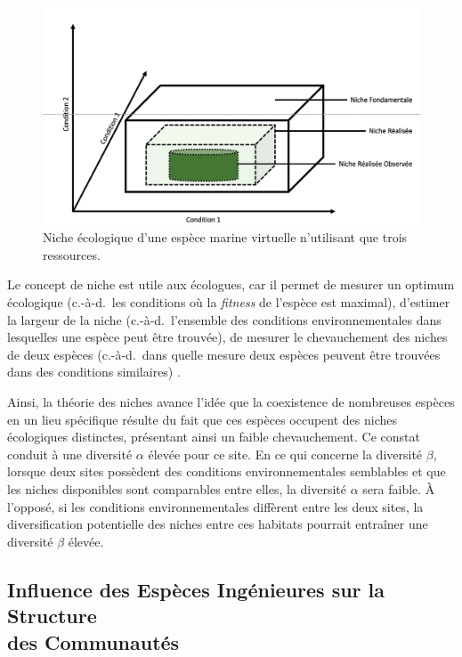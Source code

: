 \begin{refsection}
\begin{figure}
\hypertarget{fig:intro4}{%
\centering
\includegraphics{02-Introduction/figures/hypervolume_niche.png}
\caption{Niche écologique d'une espèce marine virtuelle n'utilisant que
trois ressources.}\label{fig:intro4}
}
\end{figure}

Le concept de niche est utile aux écologues, car il permet de mesurer un
optimum écologique (c.-à-d.~les conditions où la \emph{fitness} de
l'espèce est maximal), d'estimer la largeur de la niche
(c.-à-d.~l'ensemble des conditions environnementales dans lesquelles une
espèce peut être trouvée), de mesurer le chevauchement des niches de
deux espèces (c.-à-d.~dans quelle mesure deux espèces peuvent être
trouvées dans des conditions similaires) \autocite{Chase_2003}.

Ainsi, la théorie des niches avance l'idée que la coexistence de
nombreuses espèces en un lieu spécifique résulte du fait que ces espèces
occupent des niches écologiques distinctes, présentant ainsi un faible
chevauchement. Ce constat conduit à une diversité \(\alpha\) élevée pour
ce site. En ce qui concerne la diversité \(\beta\), lorsque deux sites
possèdent des conditions environnementales semblables et que les niches
disponibles sont comparables entre elles, la diversité \(\alpha\) sera
faible. À l'opposé, si les conditions environnementales diffèrent entre
les deux sites, la diversification potentielle des niches entre ces
habitats pourrait entraîner une diversité \(\beta\) élevée.

\hypertarget{influence-des-espuxe8ces-inguxe9nieures-sur-la-structure-des-communautuxe9s}{%
\subsection{Influence des Espèces Ingénieures sur la Structure \\ des
Communautés}\label{influence-des-espuxe8ces-inguxe9nieures-sur-la-structure-des-communautuxe9s}}


\end{refsection}
